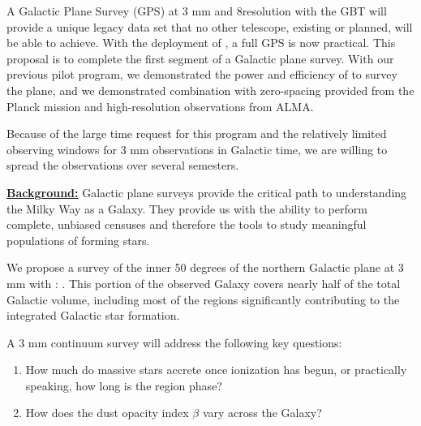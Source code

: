 \documentclass[11pt,preprint]{aastex_nofoot}
\begin{document}


A Galactic Plane Survey (GPS) at 3 mm and 8\arcsec resolution with the GBT will provide a
unique legacy data set that no other telescope, existing or planned, will be
able to achieve.  With the deployment of \MUSTANG, a full GPS is now practical.  This
proposal is to complete the first segment of a Galactic plane survey.  With
our previous pilot program, we demonstrated the power and efficiency of \MUSTANG
to survey the plane, and we demonstrated combination with zero-spacing provided
from the Planck mission and high-resolution observations from ALMA.

Because of the large time request for this program and the relatively limited
observing windows for 3 mm observations in Galactic time, we are willing
to spread the observations over several semesters.

\underline{\bf Background:}
Galactic plane surveys provide the critical path to understanding the Milky Way
as a Galaxy.  They provide us with the ability to perform complete, unbiased
censuses and therefore the tools to study meaningful populations of forming stars.

We propose a survey of the inner 50 degrees of the northern
Galactic plane at 3 mm with \MUSTANG: \MGPS.  This portion of the observed Galaxy covers
nearly half of the total Galactic volume, including most of the regions significantly
contributing to the integrated Galactic star formation.

A 3 mm continuum survey will address the following key questions:

\vspace{-2.5mm}

\begin{enumerate}

    \item How much do massive stars accrete once ionization has begun, or practically speaking, how
        long is the \hchii region phase?
    \item How does the dust opacity index $\beta$  vary across the Galaxy?  

\end{enumerate}
\vspace{-2.5mm}
\end{document}
